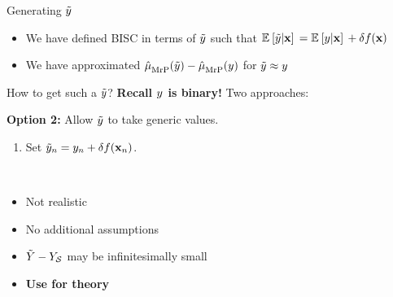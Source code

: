 \begin{frame}[t]{Generating $\tilde{y}$}
%
\begin{itemize}
\item We have defined BISC in terms of $\tilde{y}$ such that
$\mathbb{E}_{}\left[ \tilde{y} \vert \mathbf{x}\right]\, = \mathbb{E}_{}\left[ y \vert \mathbf{x}\right]\, + \delta f(\mathbf{x})$
\item We have approximated $\hat{\mu}^{}_{\mathrm{MrP}}(\tilde{y}) - \hat{\mu}^{}_{\mathrm{MrP}}(y)$ for $\tilde{y} \approx y$
\end{itemize}
%
How to get such a $\tilde{y}$?  \textbf{Recall $y$ is binary!}  Two approaches:


 {
    \centering
    \textbf{Option 2:} Allow $\tilde{y}$ to take generic values.
    \begin{enumerate}
        \item Set $\tilde{y}_n = y_n + \delta f(\mathbf{x}_n)$.
    \end{enumerate}
} \pause
%
\\[1em]
{
\begin{itemize}
\item Not realistic
\item No additional assumptions
\item $\tilde{Y} - Y_{\mathcal{S}}$ may be infinitesimally small
\item \textbf{Use for theory}
\end{itemize}
}



\end{frame}

